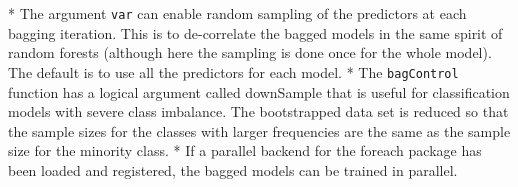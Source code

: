 \documentclass[caret-main.tex]{subfiles}
\begin{document}
* The argument \texttt{var} can enable random sampling of the predictors at each bagging iteration. This is to de-correlate the bagged models in the same spirit of random forests (although here the sampling is done once for the whole model). The default is to use all the predictors for each model.
* The \texttt{bagControl} function has a logical argument called downSample that is useful for classification models with severe class imbalance. The bootstrapped data set is reduced so that the sample sizes for the classes with larger frequencies are the same as the sample size for the minority class.
* If a parallel backend for the foreach package has been loaded and registered, the bagged models can be trained in parallel.

\end{document}
